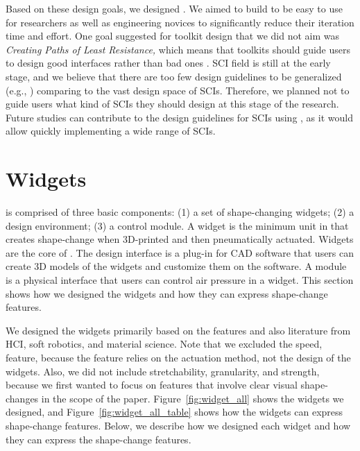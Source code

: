     Based on these design goals, we designed \mp. We aimed to build \mp to be
    easy to use for researchers as well as engineering novices to significantly
    reduce their iteration time and effort. One goal suggested for toolkit
    design that we did not aim was \textit{Creating Paths of Least Resistance,}
    which means that toolkits should guide users to design good interfaces
    rather than bad ones \cite{Myers:2000us, 10.1145/3173574.3173873}.
    SCI field is still at the early stage, and we believe that there are
    too few design guidelines to be generalized (e.g.,
    \cite{10.1145/2556288.2557360, 10.3389/frobt.2019.00079,
    10.1145/2858036.2858350}) comparing to the vast design space of SCIs.
    Therefore, we planned not to guide users what kind of SCIs they should
    design at this stage of the research.  Future studies can contribute to the
    design guidelines for SCIs using \mp, as it would allow quickly implementing
    a wide range of SCIs.

  \section{\mp Widgets}
    \mp is comprised of three basic components: (1) a set of shape-changing
    widgets; (2) a design environment; (3) a control module. A widget is the
    minimum unit in \mp that creates shape-change when 3D-printed and then
    pneumatically actuated. Widgets are the core of \mp. The design interface is
    a plug-in for CAD software that users can create 3D models of the widgets
    and customize them on the software. A module is a physical interface that
    users can control air pressure in a widget. This section shows how we
    designed the widgets and how they can express shape-change features.
      
    We designed the widgets primarily based on the features and also literature
    from HCI, soft robotics, and material science. Note that we excluded the
    speed, feature, because the feature relies on the actuation method, not the
    design of the widgets. Also, we did not include stretchability, granularity,
    and strength, because we first wanted to focus on features that involve
    clear visual shape-changes in the scope of the paper.
    Figure~\ref{fig:widget_all} shows the widgets we designed, and
    Figure~\ref{fig:widget_all_table} shows how the widgets can express
    shape-change features. Below, we describe how we designed each widget and
    how they can express the shape-change features.
      
